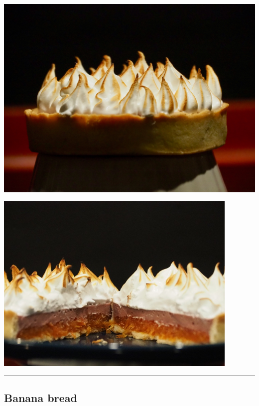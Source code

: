 \documentclass[]{book}
\begin{document}
\begin{center}\includegraphics[width=0.9\linewidth]{photos/pamp1} \end{center}

\begin{center}\includegraphics[width=0.9\linewidth]{photos/pamp2} \end{center}

\begin{center}\rule{0.5\linewidth}{0.5pt}\end{center}

\hypertarget{banana-bread}{%
\subsection*{\texorpdfstring{{Banana bread}}{Banana bread}}\label{banana-bread}}
\end{document}
